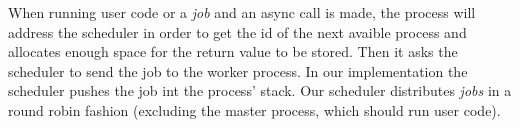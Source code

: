 When running user code or a \emph{job} and an async call is made, the process will address the scheduler in order
to get the id of the next avaible process and allocates enough space for the return value to be stored.
Then it asks the scheduler to send the job to the worker process.  In our implementation the scheduler 
pushes the job int the process' stack.  Our scheduler distributes \emph{jobs} in a round robin fashion 
(excluding the master process, which should run user code). 







 


